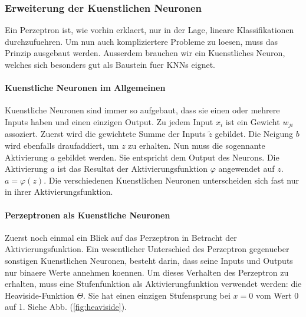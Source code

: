 \documentclass[../main]{subfiles}
\begin{document}

\subsubsection{Erweiterung der Kuenstlichen Neuronen}\label{sec:kuenstlicheNeuronen}
Ein Perzeptron ist, wie vorhin erklaert, nur in der Lage, lineare Klassifikationen
durchzufuehren. Um nun auch kompliziertere Probleme zu loesen, muss das Prinzip
ausgebaut werden. Ausserdem brauchen wir ein Kuenstliches Neuron, welches sich
besonders gut als Baustein fuer KNNs eignet.

\paragraph{Kuenstliche Neuronen im Allgemeinen}
Kuenstliche Neuronen sind immer so aufgebaut, dass sie einen oder mehrere Inputs
haben und einen einzigen Output. Zu jedem Input $x_i$ ist ein Gewicht
$w_{ji}$ assoziert. Zuerst wird die gewichtete Summe der Inputs $\tilde{z}$ gebildet.
Die Neigung $b$ wird ebenfalls draufaddiert, um $z$ zu erhalten. Nun muss
die sogennante Aktivierung $a$ gebildet werden. Sie entspricht dem Output des Neurons.
Die Aktivierung $a$ ist das Resultat der Aktivierungsfunktion $\varphi$ angewendet
auf $z$. $a = \varphi(z)$. Die verschiedenen Kuenstlichen Neuronen unterscheiden
sich fast nur in ihrer Aktivierungsfunktion.

\paragraph{Perzeptronen als Kuenstliche Neuronen}
Zuerst noch einmal ein Blick auf das Perzeptron in Betracht der Aktivierungsfunktion.
Ein wesentlicher Unterschied des Perzeptron gegenueber sonstigen Kuenstlichen
Neuronen, besteht darin, dass seine Inputs und Outputs nur binaere Werte
annehmen koennen. Um dieses Verhalten des Perzeptron zu erhalten,
muss eine Stufenfunktion als Aktivierungfunktion verwendet werden: die Heaviside-Funktion $\Theta$.
Sie hat einen einzigen Stufensprung bei $x=0$ vom Wert 0 auf 1. Siehe Abb. (\ref{fig:heaviside}).
\end{document}
